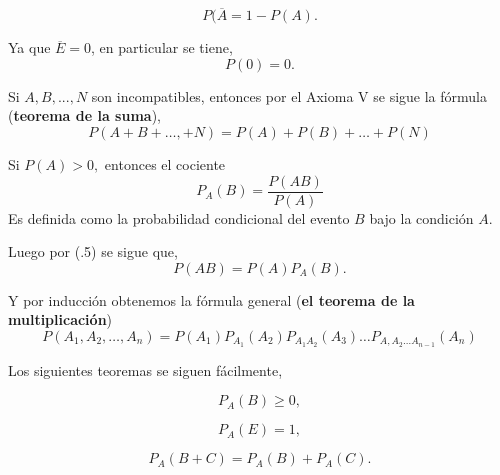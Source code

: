 \begin{equation}
    P(\overline{A} = 1-P(A).
\end{equation}

Ya que $\overline{E}=0$, en particular se tiene, 
\begin{equation}
    P(0)=0.
\end{equation}
\vspace{.2cm}

\begin{tcolorbox}[colframe=white]
Si $A,B,...,N$ son incompatibles, entonces por el Axioma V se sigue la fórmula (\textbf{teorema de la suma}), 
\begin{equation}
    P(A+B+\ldots,+N) = P(A) + P(B) + \ldots + P(N)
\end{equation}
\end{tcolorbox}

\begin{tcolorbox}[colframe=white]
Si $P(A)>0,$ entonces el cociente 
\begin{equation}
    P_A(B)=\dfrac{P(AB)}{P(A)}
\end{equation}
Es definida como la probabilidad condicional del evento $B$ bajo la condición $A$.
\end{tcolorbox}

Luego por (.5) se sigue que, 
\begin{equation}
    P(AB)=P(A)P_A(B).
\end{equation}

\begin{tcolorbox}[colframe=white]
Y por inducción obtenemos la fórmula general (\textbf{el teorema de la multiplicación})
\begin{equation}
    P(A_1, A_2,\ldots,A_n)=P(A_1) P_{A_1}(A_2) P_{A_1 A_2}(A_3) \ldots P_{A,A_2\ldots A_{n-1}}(A_n)
\end{equation}
\end{tcolorbox}

Los siguientes teoremas se siguen fácilmente,

\begin{equation}
    P_A(B)\geq 0,
\end{equation}

\begin{equation}
    P_A(E)=1,
\end{equation}

\begin{equation}
    P_A(B+C)=P_A(B)+P_A(C).
\end{equation}

